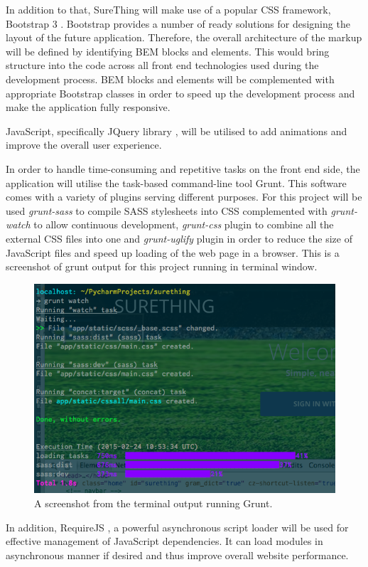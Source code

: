 In addition to that, SureThing will make use of a popular CSS framework, Bootstrap 3 \citep{documentation:Bootstrap3}. Bootstrap provides a number of ready solutions for designing the layout of the future application. Therefore, the overall architecture of the markup will be defined by identifying BEM blocks and elements. This would bring structure into the code across all front end technologies used during the development process. BEM blocks and elements will be complemented with appropriate Bootstrap classes in order to speed up the development process and make the application fully responsive.
 
JavaScript, specifically JQuery library \citep{documentation:jQuery}, will be utilised to add animations and improve the overall user experience.  

In order to handle time-consuming and repetitive tasks on the front end side, the application will utilise the task-based command-line tool Grunt. This software comes with a variety of plugins serving different purposes. For this project will be used \emph{grunt-sass} to compile SASS stylesheets into CSS complemented with \emph{grunt-watch} to allow continuous development, \emph{grunt-css} plugin to combine all the external CSS files into one and \emph{grunt-uglify} plugin in order to reduce the size of JavaScript files and speed up loading of the web page in a browser. This is a screenshot of grunt output for this project running in terminal window.

\begin{figure}[H]
	\begin{center}
		\includegraphics[width=.60\textwidth]{impl/images/gruntInAction}
		\caption{A screenshot from the terminal output running Grunt.} \label{fig:using:gruntinaction}
	\end{center}
\end{figure}
	
In addition, RequireJS  \citep{documentation:RequireJS}, a powerful asynchronous script loader will be used for effective management of JavaScript dependencies. It can load modules in asynchronous manner if desired and thus improve overall website performance.

